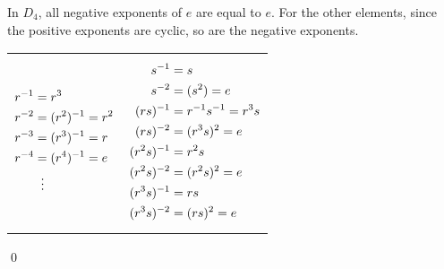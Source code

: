 \documentclass[../algebraNotesMSRI-UP2016.tex]{subfiles}
\begin{document}
\begin{frame}
In $D_4$, all negative exponents of $e$ are equal to $e$.  For the other elements, since the positive exponents are cyclic, so are the negative exponents.
\begin{tabular}{p{}p{}}
{\begin{align*}
r^{-1} &= r^3 \\
r^{-2} &= (r^2)^{-1} = r^2 \\
r^{-3} &= (r^3)^{-1} = r \\
r^{-4} &= (r^4)^{-1} = e \\
	&\;\;\vdots
\end{align*}
} & {\begin{align*}
s^{-1} &= s \\
s^{-2} &= (s^2)=e \\
(rs)^{-1} &= r^{-1}s^{-1} =r^3s \\
(rs)^{-2} &= (r^3s)^2 = e \\
(r^2s)^{-1} &= r^2s \\
(r^2s)^{-2} &= (r^2s)^2=e \\
(r^3s)^{-1} &= rs \\
(r^3s)^{-2} &= (rs)^2 = e
\end{align*}
}
\end{tabular}
\qed
\end{frame}

\end{document}
